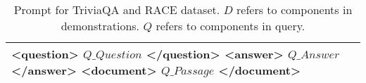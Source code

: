 \begin{table*}[ht]
\begin{tabularx}{\textwidth}{X|X}
<question> $Q\_Question$ </question> \newline
<answer> $Q\_Answer$ </answer> \newline
<document> $Q\_Passage$ </document> \newline
\\
\hline
\end{tabularx}
\vspace{-1.0em}
\caption{Prompt for TriviaQA and RACE dataset. $D$ refers to components in demonstrations. $Q$ refers to components in query.}
\label{tab:prompt}
\end{table*}